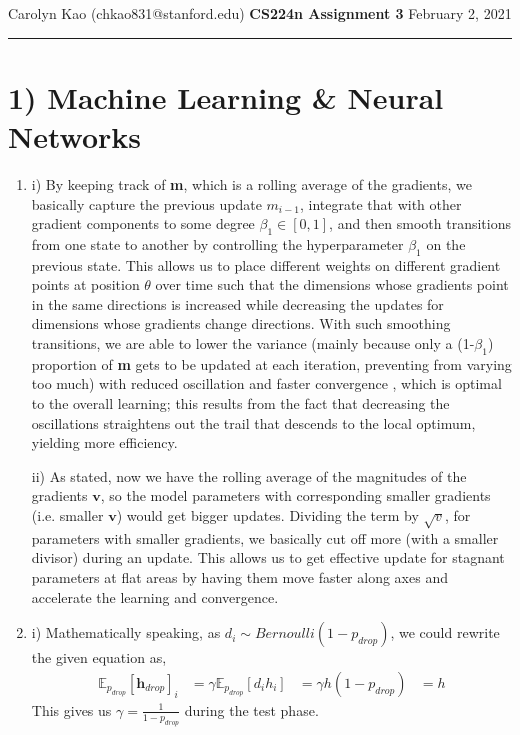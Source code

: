 \documentclass{article}
\begin{document}
\noindent
Carolyn Kao (chkao831@stanford.edu) \hfill \textbf{CS224n Assignment 3} \newline 
February 2, 2021

\noindent
\rule{\linewidth}{0.4pt}


\section*{1) Machine Learning \& Neural Networks }

\begin{enumerate}[label=\alph*)]
\item \hfill \break
i) By keeping track of \textbf{m}, which is a rolling average of the gradients, we basically capture the previous update \textbf{$m_{i-1}$}, integrate that with other gradient components to some degree $\beta_1 \in [0,1]$, and then smooth transitions from one state to another by controlling the hyperparameter $\beta_1$ on the previous state. This allows us to place different weights on different gradient points at position $\theta$ over time such that the dimensions whose gradients point in the same directions is increased while decreasing the updates for dimensions whose gradients change directions. With such smoothing transitions, we are able to lower the variance (mainly because only a (1-$\beta_1$) proportion of \textbf{m} gets to be updated at each iteration, preventing from varying too much) with reduced oscillation and faster convergence , which is optimal to the overall learning; this results from the fact that decreasing the oscillations straightens out the trail that descends to the local optimum, yielding more efficiency. 

ii) As stated, now we have the rolling average of the magnitudes of the gradients $\textbf{v}$, so the model parameters with corresponding smaller gradients (i.e. smaller $\textbf{v}$) would get bigger updates. Dividing the term by $\sqrt{v}$, for parameters with smaller gradients, we basically cut off more (with a smaller divisor) during an update. This allows us to get effective update for stagnant parameters at flat areas by having them move faster along axes and accelerate the learning and convergence. 
\item \hfill \break
i) Mathematically speaking, as $d_{i} \sim Bernoulli(1-p_{drop})$, we could rewrite the given equation as,
$$\begin{aligned} \mathbb{E}_{p_{drop}}[\mathbf{h}_{drop}]_{i} &=  \gamma \mathbb{E}_{p_{drop}}[d_{i}h_{i}]  &= \gamma h(1-p_{drop}) &= h \end{aligned} $$
This gives us $\gamma = \frac{1}{1-p_{drop}}$ during the test phase. 


\end{enumerate}
\end{document}
